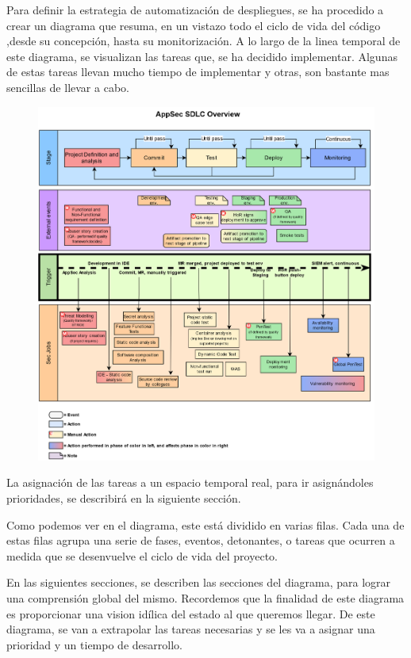 \documentclass[12pt]{report} %
\begin{document}
Para definir la estrategia de automatización de despliegues, se ha procedido a
crear un diagrama que resuma, en un vistazo todo el ciclo de vida del código
,desde su concepción, hasta su monitorización.  A lo largo de la linea temporal
de este diagrama, se visualizan las tareas que, se ha decidido implementar.
Algunas de estas tareas llevan mucho tiempo de implementar y otras, son bastante
mas sencillas de llevar a cabo.

\begin{figure}[H] \includegraphics[width=\textwidth]{SDLC-Sec} \end{figure}

La asignación de las tareas a un espacio temporal real, para ir asignándoles
prioridades, se describirá en la siguiente sección.

Como podemos ver en el diagrama, este está dividido en varias filas.  Cada una
de estas filas agrupa una serie de fases, eventos, detonantes, o tareas que
ocurren a medida que se desenvuelve el ciclo de vida del proyecto.

En las siguientes secciones, se describen las secciones del diagrama, para
lograr una comprensión global del mismo.  Recordemos que la finalidad de este
diagrama es proporcionar una vision idílica del estado al que queremos llegar.
De este diagrama, se van a extrapolar las tareas necesarias y se les va a
asignar una prioridad y un tiempo de desarrollo. 
\end{document}
